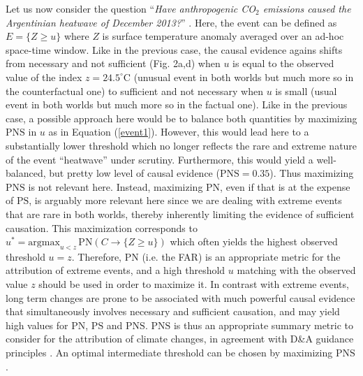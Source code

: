 \documentclass[12pt]{article}
\newcommand{\PN}{\textrm{PN}}
\newcommand{\PS}{\textrm{PS}}
\newcommand{\PNS}{\textrm{PNS}}
\begin{document}
Let us now consider the question ``\textit{Have anthropogenic CO$_2$ emissions caused the Argentinian heatwave of December 2013?}'' \citep{HVC15}. Here, the event can be defined as $E=\{Z\geq u\}$ where $Z$ is surface temperature anomaly averaged over an ad-hoc space-time window. Like in the previous case, the causal evidence agains shifts from necessary and not sufficient (Fig. 2a,d) when $u$ is equal to the observed value of the index $z=24.5^\circ$C (unusual event in both worlds but much more so in the counterfactual one) to sufficient and not necessary when $u$ is small (usual event in both worlds but much more so in the factual one). %
Like in the previous case, a possible approach here would be to balance both quantities by maximizing $\PNS$ in $u$ as in Equation (\ref{event1}). However, this would lead here to a substantially lower threshold which no longer reflects the rare and extreme nature of the event ``heatwave'' under scrutiny. Furthermore, this would yield a well-balanced, but pretty low level of causal evidence ($\PNS=0.35$). Thus maximizing $\PNS$ is not relevant here. Instead, maximizing $\PN$, even if that is at the expense of $\PS$, is arguably more relevant here since we are dealing with extreme events that are rare in both worlds, thereby inherently limiting the evidence of sufficient causation. This maximization corresponds to $u^* = \textrm{argmax}_{u< z}\,\PN(C\rightarrow \{Z\geq u\})$ which often yields the highest observed threshold $u=z$. %
Therefore, $\PN$ (i.e. the FAR) is an appropriate metric for the attribution of extreme events, and a high threshold $u$ matching with the observed value $z$ should be used in order to maximize it. %
In contrast with extreme events, long term changes are prone to be associated with much powerful causal evidence that simultaneously involves necessary and sufficient causation, and may yield high values for $\PN$, $\PS$ and $\PNS$. $\PNS$ is thus an appropriate summary metric to consider for the attribution of climate changes, in agreement with D\&A guidance principles \citep{Guidance}. An optimal intermediate threshold can be chosen by maximizing $\PNS$.
\end{document}
